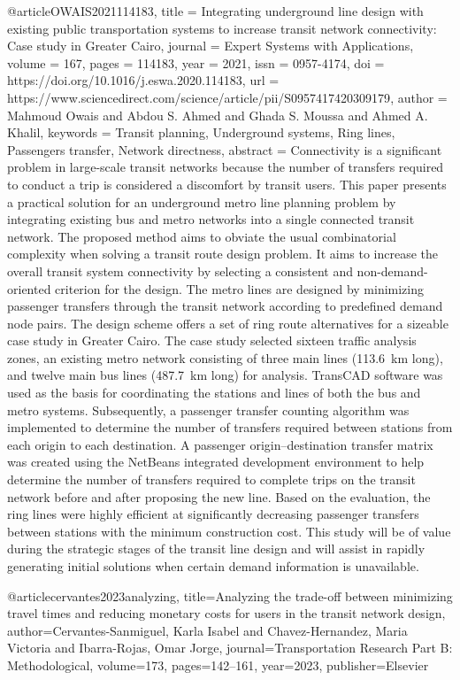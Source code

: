 {@article{OWAIS2021114183,
title = {Integrating underground line design with existing public transportation systems to increase transit network connectivity: Case study in Greater Cairo},
journal = {Expert Systems with Applications},
volume = {167},
pages = {114183},
year = {2021},
issn = {0957-4174},
doi = {https://doi.org/10.1016/j.eswa.2020.114183},
url = {https://www.sciencedirect.com/science/article/pii/S0957417420309179},
author = {Mahmoud Owais and Abdou S. Ahmed and Ghada S. Moussa and Ahmed A. Khalil},
keywords = {Transit planning, Underground systems, Ring lines, Passengers transfer, Network directness},
abstract = {Connectivity is a significant problem in large-scale transit networks because the number of transfers required to conduct a trip is considered a discomfort by transit users. This paper presents a practical solution for an underground metro line planning problem by integrating existing bus and metro networks into a single connected transit network. The proposed method aims to obviate the usual combinatorial complexity when solving a transit route design problem. It aims to increase the overall transit system connectivity by selecting a consistent and non-demand-oriented criterion for the design. The metro lines are designed by minimizing passenger transfers through the transit network according to predefined demand node pairs. The design scheme offers a set of ring route alternatives for a sizeable case study in Greater Cairo. The case study selected sixteen traffic analysis zones, an existing metro network consisting of three main lines (113.6 km long), and twelve main bus lines (487.7 km long) for analysis. TransCAD software was used as the basis for coordinating the stations and lines of both the bus and metro systems. Subsequently, a passenger transfer counting algorithm was implemented to determine the number of transfers required between stations from each origin to each destination. A passenger origin–destination transfer matrix was created using the NetBeans integrated development environment to help determine the number of transfers required to complete trips on the transit network before and after proposing the new line. Based on the evaluation, the ring lines were highly efficient at significantly decreasing passenger transfers between stations with the minimum construction cost. This study will be of value during the strategic stages of the transit line design and will assist in rapidly generating initial solutions when certain demand information is unavailable.}
}

@article{cervantes2023analyzing,
  title={Analyzing the trade-off between minimizing travel times and reducing monetary costs for users in the transit network design},
  author={Cervantes-Sanmiguel, Karla Isabel and Chavez-Hernandez, Maria Victoria and Ibarra-Rojas, Omar Jorge},
  journal={Transportation Research Part B: Methodological},
  volume={173},
  pages={142--161},
  year={2023},
  publisher={Elsevier}
}

}
